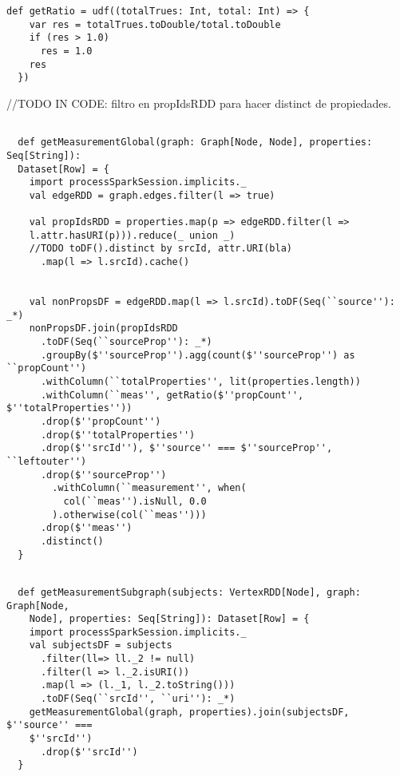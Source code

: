 \lstset{escapechar=@,language=scala}
\begin{lstlisting}[caption={Cálculo del ratio},captionpos=b, label=graphmetricRatio]
  def getRatio = udf((totalTrues: Int, total: Int) => {
    var res = totalTrues.toDouble/total.toDouble
    if (res > 1.0)
      res = 1.0
    res
  })
\end{lstlisting}


//TODO IN CODE: filtro en propIdsRDD para hacer distinct de propiedades. 

\lstset{escapechar=@,language=scala}
\begin{lstlisting}[caption={Cálculo de la métrica en el grafo},captionpos=b, label=graphmetricSCglobal]

  def getMeasurementGlobal(graph: Graph[Node, Node], properties: Seq[String]):
  Dataset[Row] = {
    import processSparkSession.implicits._
    val edgeRDD = graph.edges.filter(l => true)

    val propIdsRDD = properties.map(p => edgeRDD.filter(l =>
    l.attr.hasURI(p))).reduce(_ union _)
    //TODO toDF().distinct by srcId, attr.URI(bla)
      .map(l => l.srcId).cache()


    val nonPropsDF = edgeRDD.map(l => l.srcId).toDF(Seq(``source''): _*)
    nonPropsDF.join(propIdsRDD
      .toDF(Seq(``sourceProp''): _*)
      .groupBy($''sourceProp'').agg(count($''sourceProp'') as ``propCount'')
      .withColumn(``totalProperties'', lit(properties.length))
      .withColumn(``meas'', getRatio($''propCount'', $''totalProperties''))
      .drop($''propCount'')
      .drop($''totalProperties'')
      .drop($''srcId''), $''source'' === $''sourceProp'', ``leftouter'')
      .drop($''sourceProp'')
        .withColumn(``measurement'', when(
          col(``meas'').isNull, 0.0
        ).otherwise(col(``meas'')))
      .drop($''meas'')
      .distinct()
  }

\end{lstlisting}
\lstset{escapechar=@,language=scala}
\begin{lstlisting}[caption={Cálculo de la métrica en colección de nodos},captionpos=b, label=graphmetricSC]

  def getMeasurementSubgraph(subjects: VertexRDD[Node], graph: Graph[Node,
    Node], properties: Seq[String]): Dataset[Row] = {
    import processSparkSession.implicits._
    val subjectsDF = subjects
      .filter(ll=> ll._2 != null)
      .filter(l => l._2.isURI())
      .map(l => (l._1, l._2.toString()))
      .toDF(Seq(``srcId'', ``uri''): _*)
    getMeasurementGlobal(graph, properties).join(subjectsDF, $''source'' ===
    $''srcId'')
      .drop($''srcId'')
  }

\end{lstlisting}

